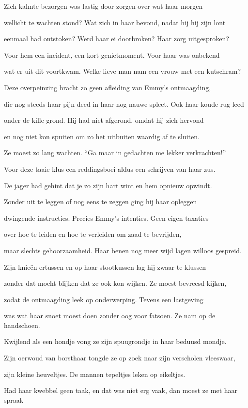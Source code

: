 Zich kalmte bezorgen
was lastig door zorgen
over wat haar morgen

wellicht te wachten stond?
Wat zich in haar bevond,
nadat hij hij zijn lont

eenmaal had ontstoken?
Werd haar ei doorbroken?
Haar zorg uitgesproken?

Voor hem een incident,
een kort genietmoment.
Voor haar was onbekend

wat er uit dit voortkwam.
Welke lieve man nam
een vrouw met een kutschram?

Deze overpeinzing
bracht zo geen afleiding
van Emmy’s ontmaagding,

die nog steeds haar pijn deed
in haar nog nauwe spleet.
Ook haar koude rug leed

onder de kille grond.
Hij had niet afgerond,
omdat hij zich hervond

en nog niet kon spuiten
om zo het uitbuiten
waardig af te sluiten.

Ze moest zo lang wachten.
“Ga maar in gedachten
me lekker verkrachten!”

Voor deze taaie klus
een reddingsboei aldus
een schrijven van haar zus.

De jager had gehint
dat je zo zijn hart wint
en hem opnieuw opwindt.

Zonder uit te leggen
of nog eens te zeggen
ging hij haar opleggen

dwingende instructies.
Precies Emmy’s intenties.
Geen eigen taxaties

over hoe te leiden
en hoe te verleiden
om zaad te bevrijden,

maar slechts gehoorzaamheid.
Haar benen nog meer wijd
lagen willoos gespreid.

Zijn knieën ertussen
en op haar stootkussen
lag hij zwaar te klussen

zonder dat mocht blijken
dat ze ook kon wijken.
Ze moest bevreesd kijken,

zodat de ontmaagding
leek op onderwerping.
Tevens een lastgeving

was wat haar snoet moest doen
zonder oog voor fatsoen.
Ze nam op de handschoen.

Kwijlend als een hondje
vong ze zijn spuugrondje
in haar beduusd mondje.

Zijn oerwoud van borsthaar
tongde ze op zoek naar
zijn verscholen vleeswaar,

zijn kleine heuveltjes.
De mannen tepeltjes
leken op eikeltjes.

Had haar kwebbel geen taak,
en dat was niet erg vaak,
dan moest ze met haar spraak

